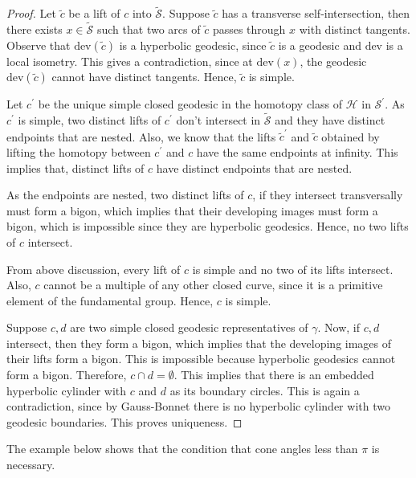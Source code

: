\begin{proof}
	Let $\tilde{c}$ be a lift of $c$ into $\widetilde{\mathcal{S}}$. Suppose $\tilde{c}$ has a transverse self-intersection, then there exists $x\in \widetilde{\mathcal{S}}$ such that two arcs of $\tilde{c}$ passes through $x$ with distinct tangents. Observe that $\text{dev}(\tilde{c})$ is a hyperbolic geodesic, since $\tilde{c}$ is a geodesic and $\text{dev}$ is a local isometry. This gives a contradiction, since at $\text{dev}(x)$, the geodesic $\text{dev}(\tilde{c})$ cannot have distinct tangents. Hence, $\tilde{c}$ is simple.
	
	 Let $c^\prime$ be the unique simple closed geodesic in the homotopy class of $\mathscr{H}$ in $\mathcal{S}^\prime$. As $c^\prime$ is simple, two distinct lifts of $c^\prime$ don't intersect in $\widetilde{\mathcal{S}}$ and they have distinct endpoints that are nested. Also, we know that the lifts $\tilde{c}^\prime$ and $\tilde{c}$ obtained by lifting the homotopy between $c^\prime$ and $c$ have the same endpoints at infinity. This implies that, distinct lifts of $c$ have distinct endpoints that are nested.
	
	As the endpoints are nested, two distinct lifts of $c$, if they intersect transversally must form a bigon, which implies that their developing images must form a bigon, which is impossible since they are hyperbolic geodesics. Hence, no two lifts of $c$ intersect.
	
	From above discussion, every lift of $c$ is simple and no two of its lifts intersect. Also, $c$ cannot be a multiple of any other closed curve, since it is a primitive element of the fundamental group. Hence, $c$ is simple.
	
	Suppose $c, d$ are two simple closed geodesic representatives of $\gamma$. Now, if $c, d$ intersect, then they form a bigon, which implies that the developing images of their lifts form a bigon. This is impossible because hyperbolic geodesics cannot form a bigon. Therefore, $c \cap d = \emptyset$. This implies that there is an embedded hyperbolic cylinder with $c$ and $d$ as its boundary circles. This is again a contradiction, since by Gauss-Bonnet there is no hyperbolic cylinder with two geodesic boundaries. This proves uniqueness. 
\end{proof}

The example below shows that the condition that cone angles less than $\pi$ is necessary. 


